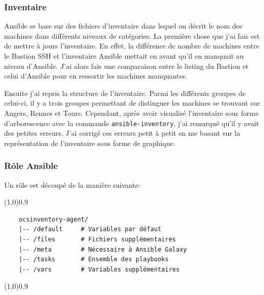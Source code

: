 \documentclass[12pt, a4paper, twoside]{article}
\begin{document}
\subsubsection{Inventaire}
\gls{Ansible} se base sur des fichiers d'inventaire dans lequel on décrit le nom des machines dans différents niveaux de catégories. 
La première chose que j'ai fais est de mettre à jours l'inventaire. 
En effet, la différence de nombre de machines entre le Bastion SSH et l'inventaire \gls{Ansible} mettait en avant qu'il en manquait au niveau d'\gls{Ansible}. 
J'ai alors fais une comparaison entre le listing du Bastion et celui d'\gls{Ansible} pour en ressortir les machines manquantes.

Ensuite j'ai repris la structure de l'inventaire. 
Parmi les différents groupes de celui-ci, il y a trois groupes permettant de distinguer les machines se trouvant sur Angers, Rennes et Tours. 
Cependant, après avoir visualisé l'inventaire sous forme d'arborescence avec la commande \verb|ansible-inventory|, j'ai remarqué qu'il y avait des petites erreurs. 
J'ai corrigé ces erreurs petit à petit en me basant sur la représentation de l'inventaire sous forme de graphique.

\subsubsection{Rôle Ansible}
Un rôle est découpé de la manière suivante:
\vspace{-1ex}
\begin{code}
\vspace{-1ex}
\begin{center} 
    \line(1,0){0.9\textwidth} 
\end{center}
\vspace{-1ex}
\begin{verbatim}
    ocsinventory-agent/
    |-- /default     # Variables par défaut
    |-- /files       # Fichiers supplémentaires
    |-- /meta        # Nécessaire à Ansible Galaxy
    |-- /tasks       # Ensemble des playbooks
    |-- /vars        # Variables supplémentaires
\end{verbatim}
\vspace{-1ex}
\begin{center} 
    \line(1,0){0.9\textwidth} 
\end{center}
\vspace{-1ex}
\end{code}
\end{document}
